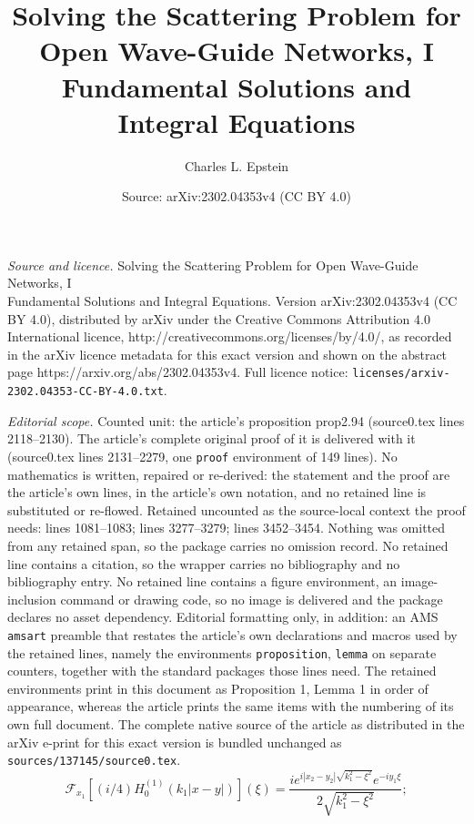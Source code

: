 \documentclass[10pt,a4paper]{amsart}
\title{Solving the Scattering Problem for Open Wave-Guide Networks, I\\Fundamental Solutions and Integral Equations}
\author{Charles L. Epstein}
\date{Source: arXiv:2302.04353v4 (CC BY 4.0)}
\newcommand\cF{\mathcal F}
\begin{document}
\maketitle

\noindent\emph{Source and licence.} Solving the Scattering Problem for Open Wave-Guide Networks, I\\Fundamental Solutions and Integral Equations. Version arXiv:2302.04353v4 (CC BY 4.0), distributed by arXiv under the Creative Commons Attribution 4.0 International licence, http://creativecommons.org/licenses/by/4.0/, as recorded in the arXiv licence metadata for this exact version and shown on the abstract page https://arxiv.org/abs/2302.04353v4. Full licence notice: \texttt{licenses/arxiv-2302.04353-CC-BY-4.0.txt}.\par\smallskip

\noindent\textit{Editorial scope.} Counted unit: the article's proposition prop2.94 (source0.tex lines 2118--2130). The article's complete original proof of it is delivered with it (source0.tex lines 2131--2279, one \texttt{proof} environment of 149 lines). No mathematics is written, repaired or re-derived: the statement and the proof are the article's own lines, in the article's own notation, and no retained line is substituted or re-flowed.  Retained uncounted as the source-local context the proof needs: lines 1081--1083; lines 3277--3279; lines 3452--3454.  Nothing was omitted from any retained span, so the package carries no omission record.  No retained line contains a citation, so the wrapper carries no bibliography and no bibliography entry.  No retained line contains a figure environment, an image-inclusion command or drawing code, so no image is delivered and the package declares no asset dependency.  Editorial formatting only, in addition: an AMS \texttt{amsart} preamble that restates the article's own declarations and macros used by the retained lines, namely the environments \texttt{proposition}, \texttt{lemma} on separate counters, together with the standard packages those lines need.  The retained environments print in this document as Proposition 1, Lemma 1 in order of appearance, whereas the article prints the same items with the numbering of its own full document.  The complete native source of the article as distributed in the arXiv e-print for this exact version is bundled unchanged as \texttt{sources/137145/source0.tex}.
\begin{equation}\label{eqn26.51}
  \cF_{x_1}[(i/4)H^{(1)}_0(k_1|x-y|)](\xi)=\frac{ie^{i|x_2-y_2|\sqrt{k_1^2-\xi^2}}e^{-iy_1\xi}}{2\sqrt{k_1^2-\xi^2}};
\end{equation}
\end{document}
